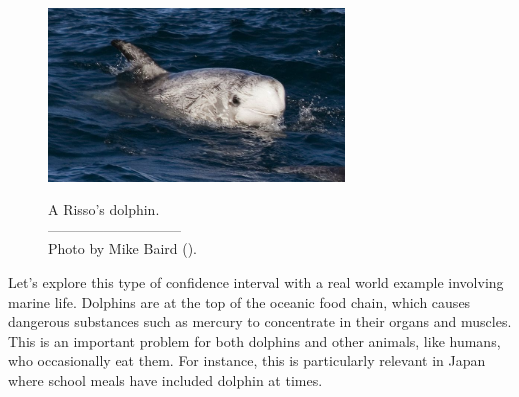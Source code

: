 



\begin{figure}[H]
\centering
\includegraphics[width=0.70\textwidth]{05/figures/rissosDolphin/rissosDolphin.jpg}  \\
\addvspace{2mm}
\begin{minipage}{\textwidth}
   \caption[rissosDolphinPic]{A Risso's dolphin.\vspace{-1mm} \\
   -----------------------------\vspace{-2mm}\\
   {\footnotesize Photo by Mike Baird ().%
}\vspace{-8mm}}
   \label{rissosDolphin}
\end{minipage}
\vspace{3mm}
\end{figure}
\setlength{\captionwidth}{\mycaptionwidth}

Let's explore this type of confidence interval with a real world example involving marine life.
Dolphins are at the top of the oceanic food chain, which causes dangerous substances such as mercury to concentrate in their organs and muscles. This is an important problem for both dolphins and other animals, like humans, who occasionally eat them. For instance, this is particularly relevant in Japan where school meals have included dolphin at times.
\setlength{\captionwidth}{71.5mm}


